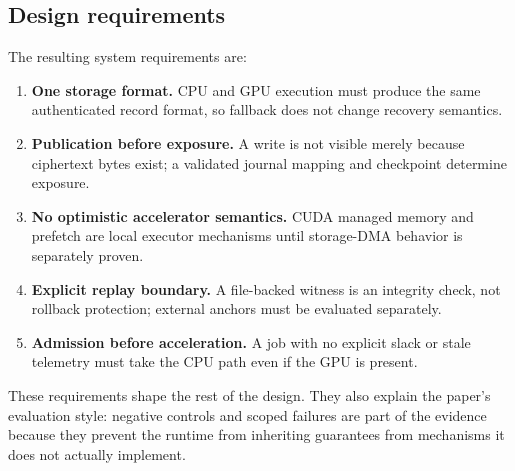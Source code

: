 \subsection{Design requirements}

The resulting system requirements are:
\begin{enumerate}
\item \textbf{One storage format.} CPU and GPU execution must produce the same authenticated record format, so fallback does not change recovery semantics.
\item \textbf{Publication before exposure.} A write is not visible merely because ciphertext bytes exist; a validated journal mapping and checkpoint determine exposure.
\item \textbf{No optimistic accelerator semantics.} CUDA managed memory and prefetch are local executor mechanisms until storage-DMA behavior is separately proven.
\item \textbf{Explicit replay boundary.} A file-backed witness is an integrity check, not rollback protection; external anchors must be evaluated separately.
\item \textbf{Admission before acceleration.} A job with no explicit slack or stale telemetry must take the CPU path even if the GPU is present.
\end{enumerate}

These requirements shape the rest of the design.  They also explain the paper's evaluation style: negative controls and scoped failures are part of the evidence because they prevent the runtime from inheriting guarantees from mechanisms it does not actually implement.

